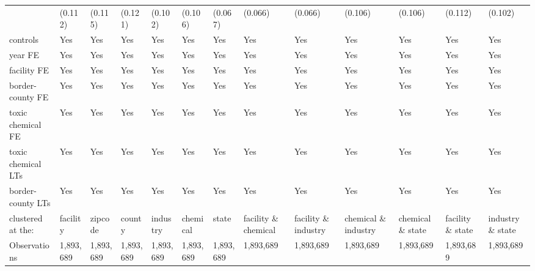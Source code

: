 \begin{table}[H]
{\begin{tabular}{@{}lllllllllllll@{}}
            & (0.112)   & (0.115)   & (0.121)   & (0.102)   & (0.106)   & (0.067)   & (0.066)              & (0.066)              & (0.106)              & (0.106)          & (0.112)          & (0.102)          \\
            controls                       & Yes       & Yes       & Yes       & Yes       & Yes       & Yes       & Yes                  & Yes                  & Yes                  & Yes               & Yes               & Yes               \\
            year FE                        & Yes       & Yes       & Yes       & Yes       & Yes       & Yes       & Yes                  & Yes                  & Yes                  & Yes               & Yes               & Yes               \\
            facility FE                    & Yes       & Yes       & Yes       & Yes       & Yes       & Yes       & Yes                  & Yes                  & Yes                  & Yes               & Yes               & Yes               \\
            border-county FE               & Yes       & Yes       & Yes       & Yes       & Yes       & Yes       & Yes                  & Yes                  & Yes                  & Yes               & Yes               & Yes               \\
            toxic chemical FE              & Yes       & Yes       & Yes       & Yes       & Yes       & Yes       & Yes                  & Yes                  & Yes                  & Yes               & Yes               & Yes               \\
            toxic chemical LTs             & Yes       & Yes       & Yes       & Yes       & Yes       & Yes       & Yes                  & Yes                  & Yes                  & Yes               & Yes               & Yes               \\
            border-county LTs              & Yes       & Yes       & Yes       & Yes       & Yes       & Yes       & Yes                  & Yes                  & Yes                  & Yes               & Yes               & Yes               \\ \midrule
            clustered at the:              & facility  & zipcode   & county    & industry  & chemical  & state     & facility \& chemical & facility \& industry & chemical \& industry & chemical \& state & facility \& state & industry \& state \\
            Observations                   & 1,893,689 & 1,893,689 & 1,893,689 & 1,893,689 & 1,893,689 & 1,893,689 & 1,893,689            & 1,893,689            & 1,893,689            & 1,893,689         & 1,893,689         & 1,893,689         \\

\end{tabular}}
\end{table}
